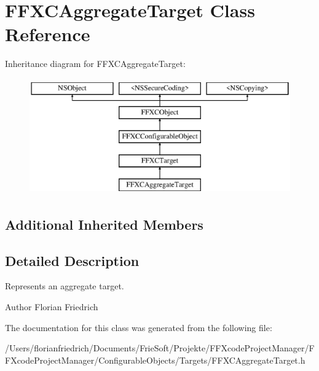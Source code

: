 \hypertarget{interface_f_f_x_c_aggregate_target}{\section{F\-F\-X\-C\-Aggregate\-Target Class Reference}
\label{interface_f_f_x_c_aggregate_target}
}
Inheritance diagram for F\-F\-X\-C\-Aggregate\-Target\-:\begin{figure}[H]
\begin{center}
\leavevmode
\includegraphics[height=5.000000cm]{interface_f_f_x_c_aggregate_target}
\end{center}
\end{figure}
\subsection*{Additional Inherited Members}


\subsection{Detailed Description}
Represents an aggregate target. \begin{DoxyAuthor}{Author}
Florian Friedrich 
\end{DoxyAuthor}


The documentation for this class was generated from the following file\-:\begin{DoxyCompactItemize}
\item 
/\-Users/florianfriedrich/\-Documents/\-Frie\-Soft/\-Projekte/\-F\-F\-Xcode\-Project\-Manager/\-F\-F\-Xcode\-Project\-Manager/\-Configurable\-Objects/\-Targets/F\-F\-X\-C\-Aggregate\-Target.\-h\end{DoxyCompactItemize}
